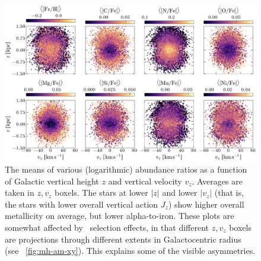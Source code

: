 \documentclass[modern]{aastex63}
\newcommand{\apogee}{\acronym{APOGEE}}
\begin{document}
\begin{figure}[!tp]
  \begin{mdframed}[style=figure]
  \begin{center}
  \includegraphics[width=\textwidth]{abundance-zvz-grid.pdf}
  \end{center}
  \caption{%
    The means of various (logarithmic) abundance ratios as a function of
    Galactic vertical height $z$ and vertical velocity $v_z$.
    Averages are taken in $z, v_z$ boxels.
    The stars at lower $|z|$ and lower $|v_z|$ (that is, the stars with
    lower overall vertical action $J_z$) show higher overall metallicity
    on average, but lower alpha-to-iron.
    These plots are somewhat affected by \apogee\ selection effects, in
    that different $z, v_z$ boxels are projections through different extents
    in Galactocentric radius (see \figurename~\ref{fig:mh-am-xy}).
    This explains some of the visible asymmetries.
  \label{fig:zvz-grid}
  }
  \end{mdframed}
\end{figure}
\end{document}
